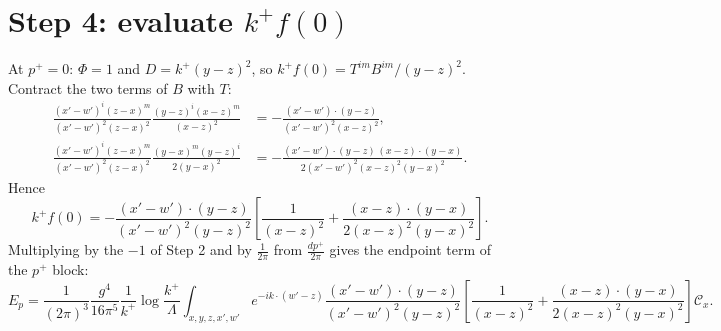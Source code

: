 \documentclass[10pt]{article}
\numberwithin{equation}{section}
\begin{document}
\section{Step 4: evaluate $k^{+}f(0)$}
At $p^{+}=0$: $\Phi=1$ and $D=k^{+}(y-z)^{2}$, so $k^{+}f(0)=T^{im}B^{im}/(y-z)^{2}$. Contract the two terms of $B$ with $T$:
\begin{align}
\frac{(x'-w')^{i}(z-x)^{m}}{(x'-w')^{2}(z-x)^{2}}\frac{(y-z)^{i}(x-z)^{m}}{(x-z)^{2}}&=-\frac{(x'-w')\cdot(y-z)}{(x'-w')^{2}(x-z)^{2}},\\
\frac{(x'-w')^{i}(z-x)^{m}}{(x'-w')^{2}(z-x)^{2}}\frac{(y-x)^{m}(y-z)^{i}}{2(y-x)^{2}}&=-\frac{(x'-w')\cdot(y-z)\,(x-z)\cdot(y-x)}{2(x'-w')^{2}(x-z)^{2}(y-x)^{2}}.
\end{align}
Hence
\begin{equation}
k^{+}f(0)=-\frac{(x'-w')\cdot(y-z)}{(x'-w')^{2}(y-z)^{2}}\left[\frac{1}{(x-z)^{2}}+\frac{(x-z)\cdot(y-x)}{2(x-z)^{2}(y-x)^{2}}\right].
\end{equation}
Multiplying by the $-1$ of Step 2 and by $\frac{1}{2\pi}$ from $\frac{dp^{+}}{2\pi}$ gives the endpoint term of the $p^{+}$ block:
\begin{equation}
E_{p}=\frac{1}{(2\pi)^{3}}\frac{g^{4}}{16\pi^{5}}\frac{1}{k^{+}}\log\frac{k^{+}}{\Lambda}\int_{x,y,z,x',w'}e^{-ik\cdot(w'-z)}\frac{(x'-w')\cdot(y-z)}{(x'-w')^{2}(y-z)^{2}}\left[\frac{1}{(x-z)^{2}}+\frac{(x-z)\cdot(y-x)}{2(x-z)^{2}(y-x)^{2}}\right]\mathcal{C}_{x}.
\end{equation}
\end{document}
